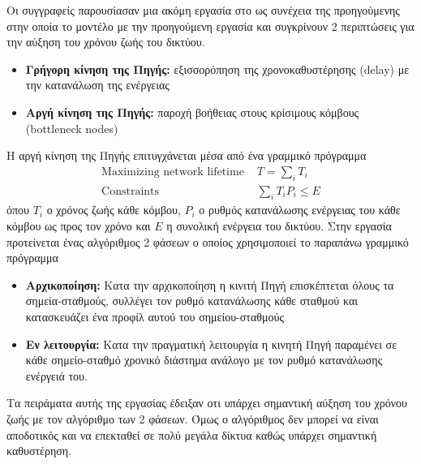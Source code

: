 Οι συγγραφείς παρουσίασαν μια ακόμη εργασία στο \cite{jointmobility_2006} ως συνέχεια της προηγούμενης στην οποία το μοντέλο με την προηγούμενη
εργασία και συγκρίνουν 2 περιπτώσεις για την αύξηση του χρόνου ζωής του δικτύου.
\begin{itemize}
\item \textbf{Γρήγορη κίνηση της Πηγής:} εξισσορόπηση της χρονοκαθυστέρησης (delay) με την κατανάλωση της ενέργειας
\item \textbf{Αργή κίνηση της Πηγής:} παροχή βοήθειας στους κρίσιμους κόμβους (bottleneck nodes)
\end{itemize}
Η αργή κίνηση της Πηγής επιτυγχάνεται μέσα από ένα γραμμικό πρόγραμμα
\begin{align*}
\text{Maximizing network lifetime } & T=\sum\limits_{i}T_{i}\\
\text{Constraints } & \sum\limits_{i}T_{i}P_{i}\leq E
\end{align*}
όπου $Τ_{i}$ ο χρόνος ζωής κάθε κόμβου, $P_{i}$ ο ρυθμός κατανάλωσης ενέργειας του κάθε κόμβου ως προς τον χρόνο και $E$ η συνολική ενέργεια του δικτύου.
Στην εργασία προτείνεται ένας αλγόριθμος 2 φάσεων ο οποίος χρησιμοποιεί το παραπάνω γραμμικό πρόγραμμα
\begin{itemize}
\item \textbf{Αρχικοποίηση:} Κατα την αρχικοποίηση η κινιτή Πηγή επισκέπτεται όλους τα σημεία-σταθμούς, συλλέγει τον ρυθμό κατανάλωσης κάθε σταθμού και κατασκευάζει
ένα προφίλ αυτού του σημείου-σταθμούς
\item \textbf{Εν λειτουργία:} Κατα την πραγματική λειτουργία η κινητή Πηγή παραμένει σε κάθε σημείο-σταθμό χρονικό διάστημα ανάλογο με τον ρυθμό κατανάλωσης ενέργειά
του.
\end{itemize}
Τα πειράματα αυτής της εργασίας έδειξαν οτι υπάρχει σημαντική αύξηση του χρόνου ζωής με τον αλγόριθμο των 2 φάσεων. Όμως ο αλγόριθμος δεν μπορεί να είναι
αποδοτικός και να επεκταθεί σε πολύ μεγάλα δίκτυα καθώς υπάρχει σημαντική καθυστέρηση.


